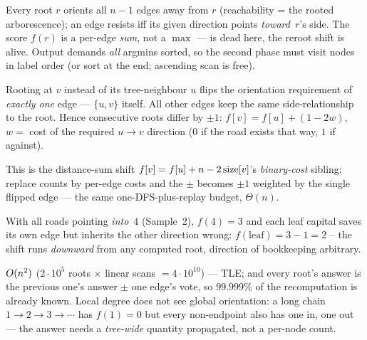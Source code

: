 Every root $r$ orients all $n-1$ edges away from $r$ (reachability = the rooted arborescence);
an edge resists iff its given direction points \emph{toward}~$r$'s side. The score
$f(r)$ is a per-edge \emph{sum}, not a $\max$ ---  is dead here, the
reroot shift is alive. Output demands \emph{all} argmins sorted, so the second phase
must visit nodes in label order (or sort at the end; ascending scan is free).

\begin{observation}
Rooting at $v$ instead of its tree-neighbour $u$ flips the orientation requirement of
\emph{exactly one} edge --- $\{u,v\}$ itself. All other edges keep the same side-relationship
to the root. Hence consecutive roots differ by $\pm 1$:
$f[v] = f[u] + (1 - 2w)$, $w = $ cost of the required $u \to v$ direction ($0$ if the
road exists that way, $1$ if against). \end{observation}
\begin{observation}
This is the distance-sum shift $f[v] = f[u] + n - 2\operatorname{size}[v]$'s \emph{binary-cost}
sibling: replace counts by per-edge costs and the $\pm$ becomes $\pm 1$ weighted by the
single flipped edge --- the same one-DFS-plus-replay budget, $\Theta(n)$.
\end{observation}
\begin{observation}
With all roads pointing \emph{into}~$4$ (Sample~2), $f(4) = 3$ and each leaf capital
saves its own edge but inherits the other direction wrong: $f(\text{leaf}) = 3 - 1 = 2$
-- the shift runs \emph{downward} from any computed root, direction of bookkeeping
arbitrary.
\end{observation}

\begin{thinkbox}
{$O(n^2)$ ($2\cdot 10^5$ roots $\times$ linear scans $=4\cdot 10^{10}$) --- TLE;
and every root's answer is the previous one's answer $\pm$ one edge's vote, so $99.999\%$
of the recomputation is already known.}
{Local degree does not see global orientation: a long chain $1\to2\to3\to\cdots$ has
$f(1) = 0$ but every non-endpoint also has one in, one out --- the answer needs a
\emph{tree-wide} quantity propagated, not a per-node count.}
\end{thinkbox}

